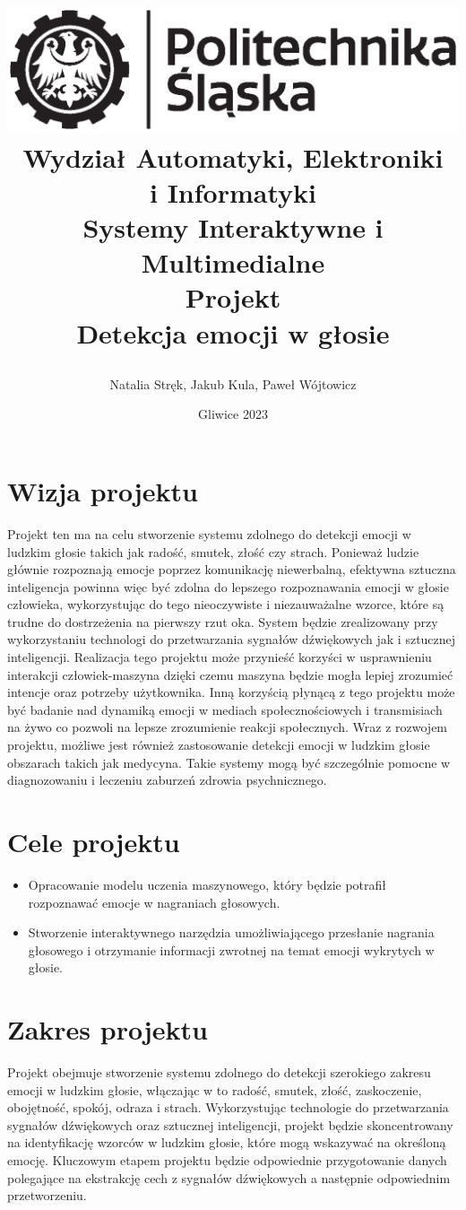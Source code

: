 \documentclass[12pt,titlepage]{article}
\title{
\includegraphics[scale=0.75]{img/politechnika_sl_logo_bw_poziom_pl.eps}\\
\textbf{Wydział Automatyki, Elektroniki\\
i Informatyki}\\
\vspace*{1cm}
Systemy Interaktywne i Multimedialne \\ Projekt \\ Detekcja emocji w głosie

\vspace*{5cm}
}
\author{
Natalia Stręk,
Jakub Kula,
Paweł Wójtowicz
}
\date{Gliwice 2023}
\begin{document}
\maketitle

\tableofcontents

\newpage


\section{Wizja projektu}
Projekt ten ma na celu stworzenie systemu zdolnego do detekcji emocji w ludzkim głosie takich jak radość, smutek, złość czy strach. Ponieważ ludzie głównie rozpoznają emocje poprzez komunikację niewerbalną, efektywna sztuczna inteligencja powinna więc być zdolna do lepszego rozpoznawania emocji w głosie człowieka, wykorzystując do tego nieoczywiste i niezauważalne wzorce, które są trudne do dostrzeżenia na pierwszy rzut oka. System będzie zrealizowany przy wykorzystaniu technologi do przetwarzania sygnałów dźwiękowych jak i sztucznej inteligencji. Realizacja tego projektu może przynieść korzyści w usprawnieniu interakcji człowiek-maszyna dzięki czemu maszyna będzie mogła lepiej zrozumieć intencje oraz potrzeby użytkownika. Inną korzyścią płynącą z tego projektu może być badanie nad dynamiką emocji w mediach społecznościowych i transmisiach na żywo co pozwoli na lepsze zrozumienie reakcji społecznych. Wraz z rozwojem projektu, możliwe jest również zastosowanie detekcji emocji w ludzkim głosie obszarach takich jak medycyna. Takie systemy mogą być szczególnie pomocne w diagnozowaniu i leczeniu zaburzeń zdrowia psychnicznego.

\section{Cele projektu}
\begin{itemize}
    \item Opracowanie modelu uczenia maszynowego, który będzie potrafił rozpoznawać emocje w nagraniach głosowych.
    \item Stworzenie interaktywnego narzędzia umożliwiającego przesłanie nagrania głosowego i otrzymanie informacji zwrotnej na temat emocji wykrytych w głosie.
\end{itemize}

\section{Zakres projektu}
Projekt obejmuje stworzenie systemu zdolnego do detekcji szerokiego zakresu emocji w ludzkim głosie, włączając w to radość, smutek, złość, zaskoczenie, obojętność, spokój, odraza i strach. Wykorzystując technologie do przetwarzania sygnałów dźwiękowych oraz sztucznej inteligencji, projekt będzie skoncentrowany na identyfikację wzorców w ludzkim głosie, które mogą wskazywać na określoną emocję. Kluczowym etapem projektu będzie odpowiednie przygotowanie danych polegające na ekstrakcję cech z sygnałów dźwiękowych a następnie odpowiednim przetworzeniu.\\
\end{document}
